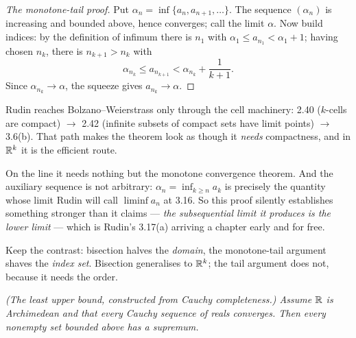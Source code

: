\begin{proof}[The monotone-tail proof]
Put $\alpha_n = \inf\{a_n, a_{n+1}, \dots\}$. The sequence $(\alpha_n)$ is
increasing and bounded above, hence converges; call the limit $\alpha$. Now
build indices: by the definition of infimum there is $n_1$ with
$\alpha_1 \le a_{n_1} < \alpha_1 + 1$; having chosen $n_k$, there is
$n_{k+1} > n_k$ with
\[ \alpha_{n_k} \le a_{n_{k+1}} < \alpha_{n_k} + \frac{1}{k+1} . \]
Since $\alpha_{n_k} \to \alpha$, the squeeze gives $a_{n_k} \to \alpha$.
\end{proof}

\begin{deeper}
Rudin reaches Bolzano--Weierstrass only through the cell machinery:
2.40 ($k$-cells are compact) $\to$ 2.42 (infinite subsets of compact sets
have limit points) $\to$ 3.6(b). That path makes the theorem look as though
it \emph{needs} compactness, and in $\mathbb{R}^k$ it is the efficient route.

On the line it needs nothing but the monotone convergence theorem. And the
auxiliary sequence is not arbitrary: $\alpha_n = \inf_{k \ge n} a_k$ is
precisely the quantity whose limit Rudin will call $\liminf a_n$ at 3.16. So
this proof silently establishes something stronger than it claims ---
\emph{the subsequential limit it produces is the lower limit} --- which is
Rudin's 3.17(a) arriving a chapter early and for free.

Keep the contrast: bisection halves the \emph{domain}, the monotone-tail
argument shaves the \emph{index set}. Bisection generalises to $\mathbb{R}^k$; the
tail argument does not, because it needs the order.
\end{deeper}

\emph{(The least upper bound, constructed from Cauchy completeness.) Assume
$\mathbb{R}$ is Archimedean and that every Cauchy sequence of reals converges. Then
every nonempty set bounded above has a supremum.}

